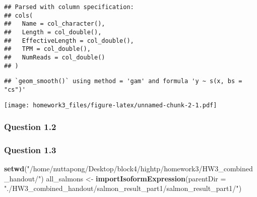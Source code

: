 \documentclass[]{article}
\newenvironment{Shaded}{\begin{snugshade}}{\end{snugshade}}
\newcommand{\DataTypeTok}[1]{\textcolor[rgb]{0.13,0.29,0.53}{#1}}
\newcommand{\DecValTok}[1]{\textcolor[rgb]{0.00,0.00,0.81}{#1}}
\newcommand{\FloatTok}[1]{\textcolor[rgb]{0.00,0.00,0.81}{#1}}
\newcommand{\KeywordTok}[1]{\textcolor[rgb]{0.13,0.29,0.53}{\textbf{#1}}}
\newcommand{\NormalTok}[1]{#1}
\newcommand{\OperatorTok}[1]{\textcolor[rgb]{0.81,0.36,0.00}{\textbf{#1}}}
\newcommand{\StringTok}[1]{\textcolor[rgb]{0.31,0.60,0.02}{#1}}
\begin{document}
\begin{verbatim}
## Parsed with column specification:
## cols(
##   Name = col_character(),
##   Length = col_double(),
##   EffectiveLength = col_double(),
##   TPM = col_double(),
##   NumReads = col_double()
## )
\end{verbatim}

\begin{Shaded}
\end{Shaded}

\begin{verbatim}
## `geom_smooth()` using method = 'gam' and formula 'y ~ s(x, bs = "cs")'
\end{verbatim}

\texttt{[image: homework3\_files/figure-latex/unnamed-chunk-2-1.pdf]}

\hypertarget{question-1.2}{%
\subsubsection{Question 1.2}\label{question-1.2}}

\hypertarget{question-1.3}{%
\subsubsection{Question 1.3}\label{question-1.3}}

\begin{Shaded}
\begin{Highlighting}[]
\KeywordTok{setwd}\NormalTok{(}\StringTok{"/home/nuttapong/Desktop/block4/hightp/homework3/HW3_combined_handout/"}\NormalTok{)}
\NormalTok{all_salmons <-}\StringTok{ }\KeywordTok{importIsoformExpression}\NormalTok{(}\DataTypeTok{parentDir =} \StringTok{"./HW3_combined_handout/salmon_result_part1/salmon_result_part1/"}\NormalTok{)}
\end{Highlighting}
\end{Shaded}
\end{document}
